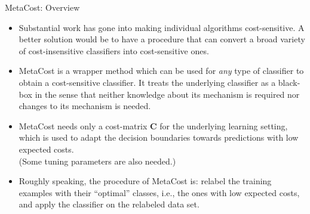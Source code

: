 \documentclass[11pt,compress,t,notes=noshow, xcolor=table]{beamer}
\begin{document}
	



\begin{vbframe}{MetaCost: Overview}
%	
	\small{
	\begin{itemize}
%		
		\item Substantial work has gone into making individual algorithms cost-sensitive. A better solution would be to have a procedure that can convert a broad variety of cost-insensitive classifiers into cost-sensitive ones.
%		
		\item MetaCost is a wrapper method which can be used for \emph{any} type of classifier to obtain a cost-sensitive classifier. It treats the underlying classifier as a black-box in the sense that neither knowledge about its mechanism is required nor changes to its mechanism is needed.
%		
		\item MetaCost needs only a cost-matrix $\mathbf{C}$ for the underlying learning setting, which is used to adapt the decision boundaries towards predictions with low expected costs. \\
		{\scriptsize (Some tuning parameters are also needed.)}
%		
		\item Roughly speaking, the procedure of MetaCost is: relabel the training examples with their ``optimal'' classes, i.e., the ones with low expected costs, and apply the classifier on the relabeled data set.
		
%		
	\end{itemize}
%
	}
%	
\end{vbframe}
\end{document}
